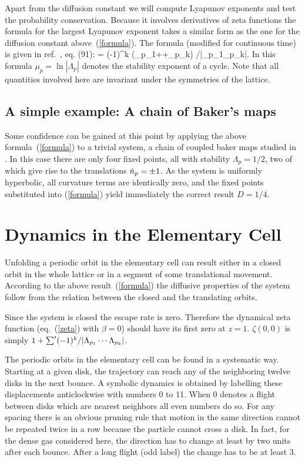 Apart from the diffusion constant we will compute Lyapunov
exponents and test the
probability conservation. Because it involves derivatives of zeta functions
the formula for the largest Lyapunov exponent takes a similar form as the one
for the diffusion constant above~(\ref{formula}).
The formula (modified for continuous time)
is given in ref.~\cite{AAC1}, eq. (91):
\be \lambda=
                       {\sumprime (-1)^k (\tau_{p_1}+\cdots +\tau_{p_k})
      /|\Lambda_{p_1}\cdots \Lambda_{p_k}|}\;. \label{eqliap} \ee
In this formula $\mu_p=\ln|\Lambda_p|$ denotes the stability exponent of a
cycle. Note that all quantities involved here are invariant under the symmetries
of the lattice.

\subsection{A simple example: A chain of Baker's maps}
Some confidence can be gained at this point by applying the above
formula~(\ref{formula}) to a trivial system, a chain of coupled
baker maps studied in \cite{gasBaker}.
In this case there are only four fixed points, all with
stability $\Lambda_p=1/2$, two of
which give rise to the translations $\hat n_{p}=\pm 1$.
As the system is
uniformly hyperbolic, all curvature terms are identically zero,
and the fixed points substituted into (\ref{formula}) yield
immediately the correct result $D=1/4$.

\section{Dynamics in the Elementary Cell} \label{CELL}
Unfolding a periodic orbit in the elementary cell can
result either in a closed orbit in the whole lattice or in a segment of
some translational movement. According to the above result~(\ref{formula})
the diffusive properties of the system follow from the relation between
the closed and the translating orbits.

Since the system is closed the escape rate is zero. Therefore
the dynamical zeta function (eq.~(\ref{zeta}) with $\beta=0$) should have its
first zero at $z=1$. $\zeta(0,0)$
is simply $1+\mathop{{\sum}'} (-1)^k/|\Lambda_{p_1}\cdots \Lambda_{p_k}|$.

The periodic orbits in the elementary cell can be found in a systematic way.
Starting at a given disk, the trajectory can reach any of the neighboring
twelve disks in the next bounce.
A symbolic dynamics is obtained by labelling
these displacements anticlockwise with numbers 0 to 11. When 0 denotes
a flight between disks which are nearest neighbors all even numbers do so. For
any spacing there is an obvious pruning rule that motion
in the same direction cannot be repeated
twice in a row because the particle cannot cross a disk. In fact, for the
dense gas considered here,
the direction has to change at least by two units after each bounce.
After a long flight (odd label) the change has to be at least 3.

